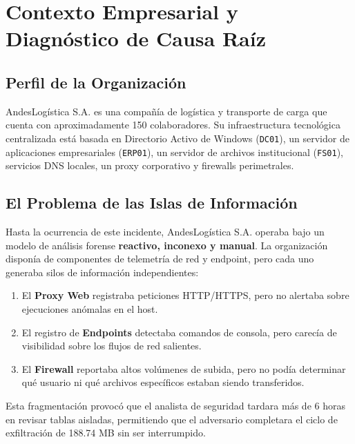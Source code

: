 \documentclass[11pt,a4paper]{article}
\begin{document}
\section{Contexto Empresarial y Diagnóstico de Causa Raíz}

\subsection{Perfil de la Organización}
AndesLogística S.A. es una compañía de logística y transporte de carga que cuenta con aproximadamente 150 colaboradores. Su infraestructura tecnológica centralizada está basada en Directorio Activo de Windows (\texttt{DC01}), un servidor de aplicaciones empresariales (\texttt{ERP01}), un servidor de archivos institucional (\texttt{FS01}), servicios DNS locales, un proxy corporativo y firewalls perimetrales.

\subsection{El Problema de las Islas de Información}
Hasta la ocurrencia de este incidente, AndesLogística S.A. operaba bajo un modelo de análisis forense \textbf{reactivo, inconexo y manual}. La organización disponía de componentes de telemetría de red y endpoint, pero cada uno generaba silos de información independientes:
\begin{enumerate}[noitemsep]
    \item El \textbf{Proxy Web} registraba peticiones HTTP/HTTPS, pero no alertaba sobre ejecuciones anómalas en el host.
    \item El registro de \textbf{Endpoints} detectaba comandos de consola, pero carecía de visibilidad sobre los flujos de red salientes.
    \item El \textbf{Firewall} reportaba altos volúmenes de subida, pero no podía determinar qué usuario ni qué archivos específicos estaban siendo transferidos.
\end{enumerate}

Esta fragmentación provocó que el analista de seguridad tardara más de 6 horas en revisar tablas aisladas, permitiendo que el adversario completara el ciclo de exfiltración de 188.74 MB sin ser interrumpido.
\end{document}
